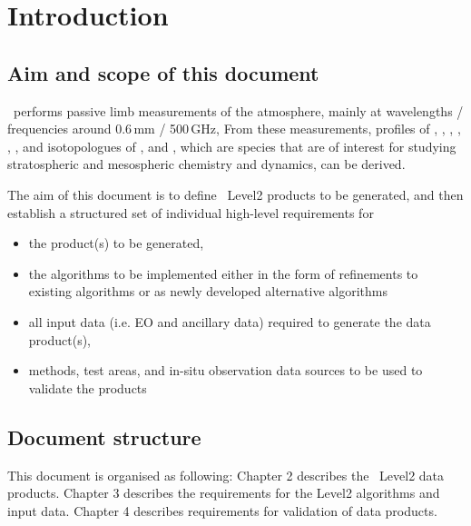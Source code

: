 \chapter{Introduction}
\label{chapter:introduction}


\setcounter{page}{1}


\section{Aim and scope of this document}
\label{sec:aim}
\smr\ performs passive limb measurements of the atmosphere,
mainly at wavelengths / frequencies around 0.6\,mm / 500\,GHz,
From these measurements, profiles of 
, , , , 
, , and isotopologues of , and ,
which are species that are of interest for studying stratospheric and 
mesospheric chemistry and dynamics, can be derived. 

The aim of this document is to define \smr\ Level2 products
to be generated, and then establish a structured set of 
individual high-level requirements for
\begin{itemize}
\item the product(s) to be generated,
\item the algorithms to be implemented either in the form of refinements to existing
  algorithms or as newly developed alternative algorithms
\item all input data (i.e. EO and ancillary data) required to generate the data product(s),
\item methods, test areas, and in-situ observation data sources to be used to validate the products
\end{itemize}

\section{Document structure}
  
This document is organised as following:
Chapter 2 describes the \smr\ Level2 data products.
Chapter 3 describes the requirements for
the \smr Level2 algorithms and input data.
Chapter 4 describes requirements for validation
of \smr data products.


